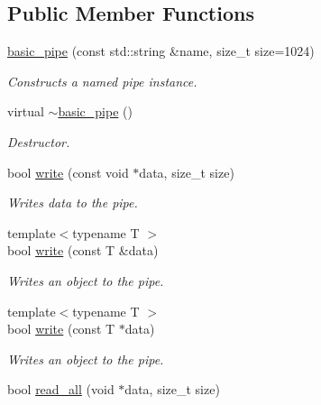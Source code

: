 \subsection*{Public Member Functions}
\begin{DoxyCompactItemize}
\item 
\hyperlink{classcpen333_1_1process_1_1basic__pipe_af61543ec6433ad27cac0433a138199b7}{basic\+\_\+pipe} (const std\+::string \&name, size\+\_\+t size=1024)
\begin{DoxyCompactList}\small\item\em Constructs a named pipe instance. \end{DoxyCompactList}\item 
\mbox{\label{classcpen333_1_1process_1_1basic__pipe_a2b449884a292300321fc2cb9b5fb6500}} 
virtual \hyperlink{classcpen333_1_1process_1_1basic__pipe_a2b449884a292300321fc2cb9b5fb6500}{$\sim$basic\+\_\+pipe} ()
\begin{DoxyCompactList}\small\item\em Destructor. \end{DoxyCompactList}\item 
bool \hyperlink{classcpen333_1_1process_1_1basic__pipe_a969c7f9d0069b13e8fd3c50d98cb94a5}{write} (const void $\ast$data, size\+\_\+t size)
\begin{DoxyCompactList}\small\item\em Writes data to the pipe. \end{DoxyCompactList}\item 
{\footnotesize template$<$typename T $>$ }\\bool \hyperlink{classcpen333_1_1process_1_1basic__pipe_a41084217cb3913a8db572b012c2a0ea5}{write} (const T \&data)
\begin{DoxyCompactList}\small\item\em Writes an object to the pipe. \end{DoxyCompactList}\item 
{\footnotesize template$<$typename T $>$ }\\bool \hyperlink{classcpen333_1_1process_1_1basic__pipe_a31a394d2126fdcf8cfaace1733f941ff}{write} (const T $\ast$data)
\begin{DoxyCompactList}\small\item\em Writes an object to the pipe. \end{DoxyCompactList}\item 
bool \hyperlink{classcpen333_1_1process_1_1basic__pipe_a72b4577f57f59f930b784ccc972805da}{read\+\_\+all} (void $\ast$data, size\+\_\+t size)

\end{DoxyCompactItemize}
